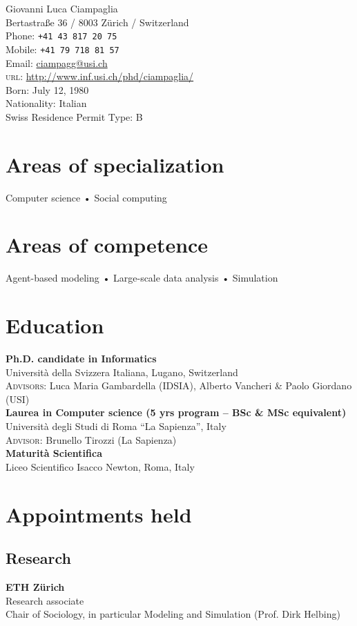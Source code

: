 \documentclass[10pt, a4paper]{article}
\newcommand{\years}[1]{\marginnote{\scriptsize #1}}
\begin{document}
{\LARGE Giovanni Luca Ciampaglia}\\[1cm]
Bertastraße 36 / 8003 Zürich / Switzerland\\[.2cm]
Phone: \texttt{+41 43 817 20 75}\\
Mobile: \texttt{+41 79 718 81 57}\\
Email: \href{mailto:ciampagg@usi.ch}{ciampagg@usi.ch}\\
\textsc{url}: \href{http://www.inf.usi.ch/phd/ciampaglia/}{http://www.inf.usi.ch/phd/ciampaglia/}\\[.2cm]
Born:  July 12, 1980\\
Nationality: Italian\\
Swiss Residence Permit Type: B

\section*{Areas of specialization}
Computer science • Social computing

\section*{Areas of competence}
Agent-based modeling • Large-scale data analysis • Simulation

\section*{Education}
\noindent
\years{2010}\textbf{Ph.D. candidate in Informatics}\\
Università della Svizzera Italiana, Lugano, Switzerland\\
\textsc{Advisors}: Luca Maria Gambardella (IDSIA), Alberto Vancheri \& Paolo Giordano (USI)\\[.1cm]
\years{2006}\textbf{Laurea in Computer science (5 yrs program -- BSc \& MSc equivalent)}\\
Università degli Studi di Roma ``La Sapienza'', Italy\\
\textsc{Advisor}: Brunello Tirozzi (La Sapienza)\\[.1cm]
\years{2000}\textbf{Maturità Scientifica}\\
Liceo Scientifico Isacco Newton, Roma, Italy\\[.1cm]

\section*{Appointments held}
\subsection*{Research}
\years{2011}\textbf{ETH Zürich}\\
Research associate\\
Chair of Sociology, in particular Modeling and Simulation (Prof. Dirk Helbing)
\end{document}
